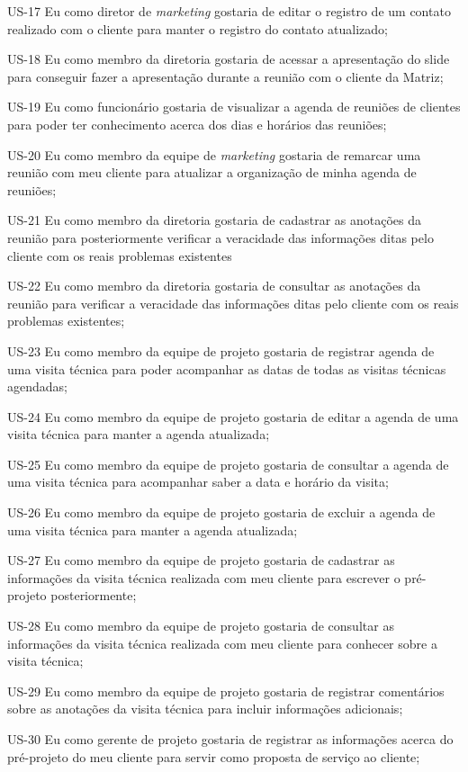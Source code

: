 US-17 Eu como diretor de \textit{marketing} gostaria de editar o registro de um contato realizado com o cliente para manter o registro do contato atualizado;


US-18 Eu como membro da diretoria gostaria de acessar a apresentação do slide para conseguir fazer a apresentação durante a reunião com o cliente da Matriz;


US-19 Eu como funcionário gostaria de visualizar a agenda de reuniões de clientes para poder ter conhecimento acerca dos dias e horários das reuniões;


US-20 Eu como membro da equipe de \textit{marketing} gostaria de remarcar uma reunião com meu cliente para atualizar a organização de minha agenda de reuniões;


US-21 Eu como membro da diretoria gostaria de cadastrar as anotações da reunião para posteriormente verificar a veracidade das informações ditas pelo cliente com os reais problemas existentes


US-22 Eu como membro da diretoria gostaria de consultar as anotações da reunião para verificar a veracidade das informações ditas pelo cliente com os reais problemas existentes;


US-23 Eu como membro da equipe de projeto gostaria de registrar agenda de uma visita técnica para poder acompanhar as datas de todas as visitas técnicas agendadas;


US-24 Eu como membro da equipe de projeto gostaria de editar a agenda de uma visita técnica para manter a agenda atualizada;


US-25 Eu como membro da equipe de projeto gostaria de consultar a agenda de uma visita técnica para acompanhar saber a data e horário da visita;


US-26 Eu como membro da equipe de projeto gostaria de excluir a agenda de uma visita técnica para manter a agenda atualizada;


US-27 Eu como membro da equipe de projeto gostaria de cadastrar as informações da visita técnica realizada com meu cliente para escrever o pré-projeto posteriormente;


US-28 Eu como membro da equipe de projeto gostaria de consultar as informações da visita técnica realizada com meu cliente para conhecer sobre a visita técnica;


US-29 Eu como membro da equipe de projeto gostaria de registrar comentários sobre as anotações da visita técnica para incluir informações adicionais;


US-30 Eu como gerente de projeto gostaria de registrar as informações acerca do pré-projeto do meu cliente para servir como proposta de serviço ao cliente;


